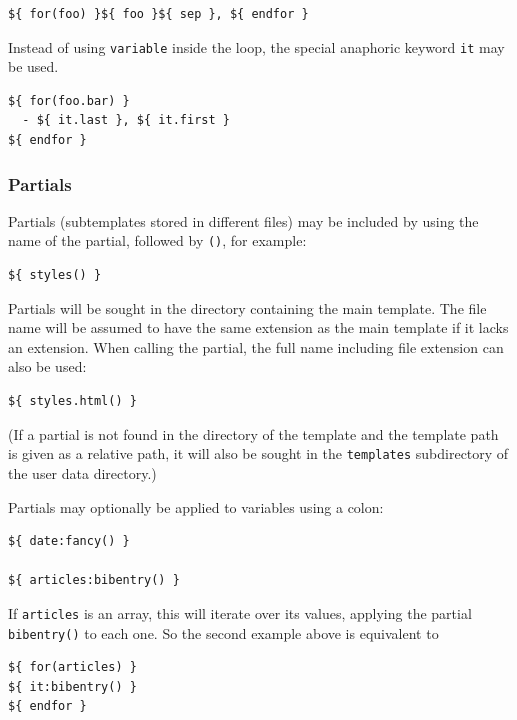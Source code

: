 \documentclass[
]{article}
\begin{document}
\begin{verbatim}
${ for(foo) }${ foo }${ sep }, ${ endfor }
\end{verbatim}

Instead of using \texttt{variable} inside the loop, the special
anaphoric keyword \texttt{it} may be used.

\begin{verbatim}
${ for(foo.bar) }
  - ${ it.last }, ${ it.first }
${ endfor }
\end{verbatim}

\hypertarget{partials}{%
\subsubsection{Partials}\label{partials}}

Partials (subtemplates stored in different files) may be included by
using the name of the partial, followed by \texttt{()}, for example:

\begin{verbatim}
${ styles() }
\end{verbatim}

Partials will be sought in the directory containing the main template.
The file name will be assumed to have the same extension as the main
template if it lacks an extension. When calling the partial, the full
name including file extension can also be used:

\begin{verbatim}
${ styles.html() }
\end{verbatim}

(If a partial is not found in the directory of the template and the
template path is given as a relative path, it will also be sought in the
\texttt{templates} subdirectory of the user data directory.)

Partials may optionally be applied to variables using a colon:

\begin{verbatim}
${ date:fancy() }

${ articles:bibentry() }
\end{verbatim}

If \texttt{articles} is an array, this will iterate over its values,
applying the partial \texttt{bibentry()} to each one. So the second
example above is equivalent to

\begin{verbatim}
${ for(articles) }
${ it:bibentry() }
${ endfor }
\end{verbatim}
\end{document}
